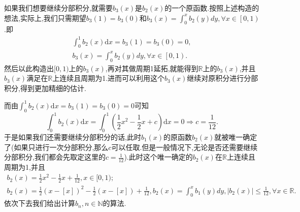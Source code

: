 \documentclass[../../main.tex]{subfiles}
\begin{document}
\begin{remark}
如果我们想要继续分部积分,就需要$b_3(x)$是$b_2(x)$的一个原函数.按照上述构造的想法,实际上,我们只需期望\(b_3(1)=b_3(0)\)和$b_3(x)=\int_0^x{b_2\left( y \right) dy},\forall x\in \left[ 0,1 \right) $.即
\begin{gather*}
\int_{0}^{1}b_2(x)\mathrm{d}x =b_3(1)=b_3(0)= 0,
\\
b_3(x)=\int_0^x{b_2\left( y \right) dy},\forall x\in \left[ 0,1 \right).
\end{gather*}
然后以此构造出$[0,1)$上的$b_3(x)$,再对其做周期1延拓,就能得到$\mathbb{R}$上的$b_3(x)$,并且$b_3(x)$满足在$\mathbb{R}$上连续且周期为1.进而可以利用这个$b_3(x)$继续对原积分进行分部积分,得到更加精细的估计.

而由\(\int_{0}^{1}b_2(x)\mathrm{d}x =b_3(1)=b_3(0)= 0\)可知
\[
\int_{0}^{1}b_2(x)\mathrm{d}x=\int_{0}^{1}\left(\frac{1}{2}x^2-\frac{1}{2}x + c\right)\mathrm{d}x = 0\Rightarrow c=\frac{1}{12}.
\]
于是如果我们还需要继续分部积分的话,此时$b_1(x)$的原函数\(b_2(x)\)就被唯一确定了(如果只进行一次分部积分,那么$c$可以任取.但是一般情况下,无论是否还需要继续分部积分,我们都会先取定这里的$c=\frac{1}{12}$).此时这个唯一确定的$b_2(x)$在$\mathbb{R}$上连续且周期为1,\hypertarget{b2性质}{并且}
\begin{gather*}
b_2(x)=\frac{1}{2}x^2-\frac{1}{2}x + \frac{1}{12},x\in[0,1);
\\
b_2(x)=\frac{1}{2}\left( x-\left[ x \right] \right) ^2-\frac{1}{2}\left( x-\left[ x \right] \right) +\frac{1}{12},b_2\left( x \right) =\int_0^x{b_1\left( y \right) dy},\left| b_2\left( x \right) \right|\leqslant \frac{1}{12},\forall x\in \mathbb{R}.
\end{gather*}
依次下去我们给出计算\(b_n,n\in\mathbb{N}\)的算法.
\end{remark}
\end{document}

